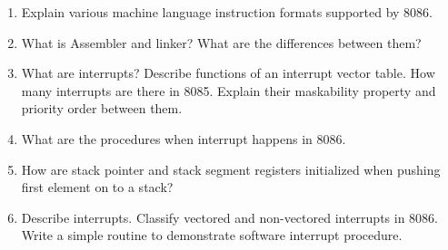 \documentclass[12pt, a4paper]{scrartcl}
\begin{document}
\begin{enumerate}
		\item Explain various machine language instruction formats supported by 8086.
		\item What is Assembler and linker? What are the differences between them?
		\item What are interrupts? Describe functions of an interrupt vector table. How many interrupts are there in 8085. Explain their maskability property and priority order between them.
		\item What are the procedures when interrupt happens in 8086.
		\item How are stack pointer and stack segment registers initialized when pushing first element on to a stack?
		\item Describe interrupts. Classify vectored and non-vectored interrupts in 8086. Write a simple routine to demonstrate software interrupt procedure.
	\end{enumerate}
\end{document}
